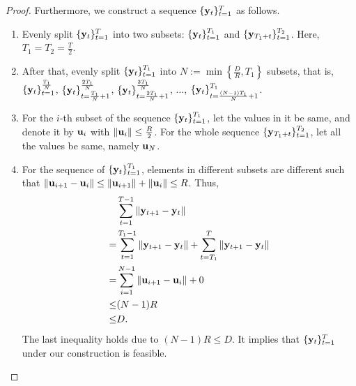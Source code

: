 \documentclass[journal]{IEEEtran}
\begin{document}
\begin{proof}
Furthermore, we construct  a sequence $\{{\bf y}_t\}_{t=1}^T$ as follows.

\begin{enumerate}
    \item Evenly split $\{{\bf y}_t\}_{t=1}^{T}$ into two subsets: $\{{\bf y}_t\}_{t=1}^{T_1}$ and $\{{\bf y}_{T_1+t}\}_{t=1}^{T_2}$. Here, $T_1 = T_2 = \frac{T}{2}$.
    \item After that, evenly split $\{{\bf y}_t\}_{t=1}^{T_1}$ into $N := \min\left\{ \frac{D}{R},T_1 \right\} $ subsets, that is, $\{{\bf y}_t\}_{t=1}^{\frac{T_1}{N}}$, $\{{\bf y}_t\}_{t=\frac{T_1}{N} + 1}^{\frac{2T_1}{N}}$, $\{{\bf y}_t\}_{t=\frac{2T_1}{N} + 1}^{\frac{3T_1}{N}}$, ..., $\{{\bf y}_t\}_{t=\frac{(N-1)T_1}{N}+1}^{T_1}$. 
    \item For the $i$-th subset of the sequence $\{{\bf y}_t\}_{t=1}^{T_1}$, let the values in it be same, and denote it by ${\bf u}_i$ with $\left\lVert{\bf u}_i\right\rVert \le \frac{R}{2}$. For the whole sequence  $\{{\bf y}_{T_1+t}\}_{t=1}^{T_2}$, let all the values be same, namely ${\bf u}_N$.
    \item For the sequence of $\{{\bf y}_t\}_{t=1}^{T_1}$, elements in different subsets are different such that $\|{\bf u}_{i+1} - {\bf u}_i\| \leq \|{\bf u}_{i+1}\| + \|{\bf u}_i\| \leq R$. Thus, 
    \begin{align}
    \nonumber
    & \sum_{t=1}^{T-1} \|{\bf y}_{t+1} - {\bf y}_{t}\| \\ \nonumber
    = & \sum_{t=1}^{T_1-1} \|{\bf y}_{t+1} - {\bf y}_{t}\| + \sum_{t=T_1}^{T} \|{\bf y}_{t+1} - {\bf y}_{t}\| \\ \nonumber
    = & \sum_{i=1}^{N-1} \|{\bf u}_{i+1} - {\bf u}_i\| + 0\\ \nonumber
    \le & (N-1)R \\ \nonumber
    \le & D.
    \end{align} The last inequality holds due to $(N-1)R \le D$.
     It implies that $\{{\bf y}_t\}_{t=1}^{T}$ under our construction is feasible.
\end{enumerate}


\end{proof}
\end{document}
